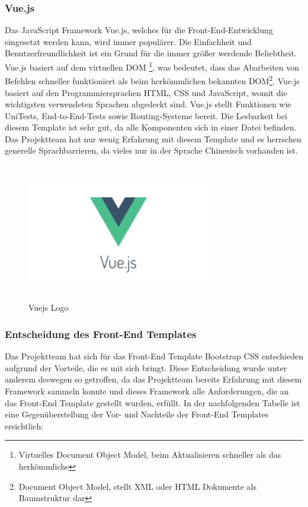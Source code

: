 \subsubsection{Vue.js}
Das JavaScript Framework Vue.js, welches für die Front-End-Entwicklung eingesetzt werden kann, wird immer populärer. Die Einfachheit und Benutzerfreundlichkeit ist ein Grund für die immer größer werdende Beliebtheit. Vue.js basiert auf dem virtuellen DOM \footnote{Virtuelles Document Object Model, beim Aktualisieren schneller als das herkömmliche}, was bedeutet, dass das Abarbeiten von Befehlen schneller funktioniert als beim herkömmlichen bekannten DOM\footnote{Document Object Model, stellt XML oder HTML Dokumente als Baumstruktur dar}. Vue.js basiert auf den Programmiersprachen HTML, CSS und JavaScript, womit die wichtigsten verwendeten Sprachen abgedeckt sind. Vue.js stellt Funktionen wie UniTests, End-to-End-Tests sowie Routing-Systeme bereit. Die Lesbarkeit bei diesem Template ist sehr gut, da alle Komponenten sich in einer Datei befinden. Das Projektteam hat nur wenig Erfahrung mit diesem Template und es herrschen generelle Sprachbarrieren, da vieles nur in der Sprache Chinesisch vorhanden ist.
\begin{figure}[h]
	\centering
	\includegraphics[height=6cm,width=8cm]{images/vuejs}
	\caption{Vuejs Logo}
	\label{fig:Vuejs Logo}
\end{figure}


\newpage
\subsubsection{Entscheidung des Front-End Templates}
Das Projektteam hat sich für das Front-End Template Bootstrap CSS entschieden aufgrund der Vorteile, die es mit sich bringt. Diese Entscheidung wurde unter anderem deswegen so getroffen, da das Projektteam bereits Erfahrung mit diesem Framework sammeln konnte und dieses Framework alle Anforderungen, die an das Front-End Template gestellt wurden, erfüllt.
In der nachfolgenden Tabelle ist eine Gegenüberstellung der Vor- und Nachteile der Front-End Templates ersichtlich:

